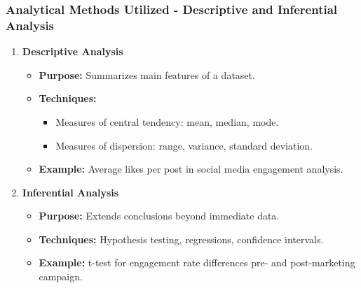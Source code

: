 \documentclass{beamer}
\begin{document}
\begin{frame}[fragile]
    \frametitle{Analytical Methods Utilized - Descriptive and Inferential Analysis}
    \begin{enumerate}
        \item \textbf{Descriptive Analysis}
        \begin{itemize}
            \item \textbf{Purpose:} Summarizes main features of a dataset.
            \item \textbf{Techniques:} 
                \begin{itemize}
                    \item Measures of central tendency: mean, median, mode.
                    \item Measures of dispersion: range, variance, standard deviation.
                \end{itemize}
            \item \textbf{Example:} Average likes per post in social media engagement analysis.
        \end{itemize}

        \item \textbf{Inferential Analysis}
        \begin{itemize}
            \item \textbf{Purpose:} Extends conclusions beyond immediate data.
            \item \textbf{Techniques:} Hypothesis testing, regressions, confidence intervals.
            \item \textbf{Example:} t-test for engagement rate differences pre- and post-marketing campaign.
        \end{itemize}
    \end{enumerate}
\end{frame}
\end{document}
